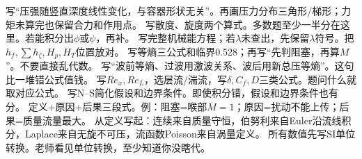 写“压强随竖直深度线性变化，与容器形状无关”。再画压力分布三角形/梯形；力矩未算完也保留合力和作用点。
写散度、旋度两个算式。多数题至少一半分在这里。若能积分出$\phi$或$\psi$，再补。
写完整机械能方程；若$\lambda$未查出，先保留$\lambda$符号。把$h_f,\sum h_\zeta,H_p,H_T$位置放对。
写等熵三公式和临界0.528；再写“先判阻塞，再算$M$”。不要直接乱代数。
写“波前等熵、过波用激波关系、波后用新总压等熵”。这句比一堆错公式值钱。
写$Re_x,Re_L$，选层流/湍流，写$\delta,C_f,D$三类公式。题问什么就取对应公式。
写N--S简化假设和边界条件。即使积分错，假设和边界条件也有分。
定义+原因+后果三段式。例：阻塞=喉部$M=1$；原因=扰动不能上传；后果=质量流量最大。
从定义写起：连续来自质量守恒，伯努利来自Euler沿流线积分，Laplace来自无旋不可压，流函数Poisson来自涡量定义。
所有数值先写SI单位转换。老师看见单位转换，至少知道你没瞎代。

